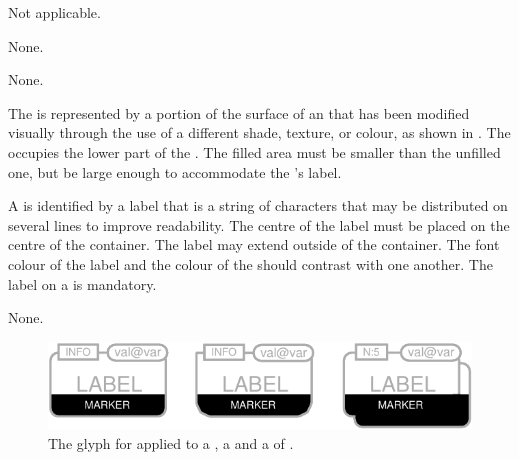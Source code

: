 \begin{glyphDescription}

\glyphSboTerm Not applicable.


\glyphIncoming
None.



\glyphOutgoing
None.


\glyphContainer
The  is represented by a portion of the surface of an  that has been modified visually through the use of a different shade, texture, or colour, as shown in .
The  occupies the lower part of the .
The filled area must be smaller than the unfilled one, but be large enough to accommodate the 's label.

\glyphLabel
A  is identified by a label that is  a string of characters that may be distributed on several lines to improve readability.
The centre of the label must be placed on the centre of the container.
The label may extend outside of the container.
The font colour of the label and the colour of the  should contrast with one another.
The label on a  is mandatory.

\glyphAux
None.

\end{glyphDescription}

\begin{figure}[H]
  \centering
  \includegraphics{images/build/labeled_clone_marker.pdf}
  \caption{The \PD glyph for  applied to a , a  and a  of .}
  \label{fig:labelledCloneMarker}
\end{figure}

